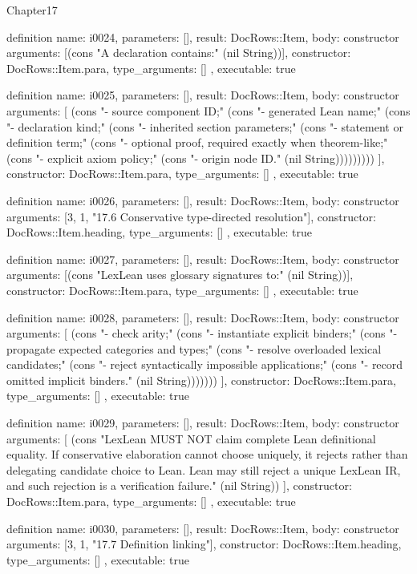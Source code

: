 \begin{lexlean}{Chapter17}
\begin{semanticmodule}
definition{
  name: i0024,
  parameters: [],
  result: DocRows::Item,
  body: constructor{
    arguments: [(cons "A declaration contains:" (nil String))],
    constructor: DocRows::Item.para,
    type_arguments: []
  },
  executable: true
}

definition{
  name: i0025,
  parameters: [],
  result: DocRows::Item,
  body: constructor{
    arguments: [
      (cons "- source component ID;" (cons "- generated Lean name;" (cons "- declaration kind;" (cons "- inherited section parameters;" (cons "- statement or definition term;" (cons "- optional proof, required exactly when theorem-like;" (cons "- explicit axiom policy;" (cons "- origin node ID." (nil String)))))))))
    ],
    constructor: DocRows::Item.para,
    type_arguments: []
  },
  executable: true
}

definition{
  name: i0026,
  parameters: [],
  result: DocRows::Item,
  body: constructor{
    arguments: [3, 1, "17.6 Conservative type-directed resolution"],
    constructor: DocRows::Item.heading,
    type_arguments: []
  },
  executable: true
}

definition{
  name: i0027,
  parameters: [],
  result: DocRows::Item,
  body: constructor{
    arguments: [(cons "LexLean uses glossary signatures to:" (nil String))],
    constructor: DocRows::Item.para,
    type_arguments: []
  },
  executable: true
}

definition{
  name: i0028,
  parameters: [],
  result: DocRows::Item,
  body: constructor{
    arguments: [
      (cons "- check arity;" (cons "- instantiate explicit binders;" (cons "- propagate expected categories and types;" (cons "- resolve overloaded lexical candidates;" (cons "- reject syntactically impossible applications;" (cons "- record omitted implicit binders." (nil String)))))))
    ],
    constructor: DocRows::Item.para,
    type_arguments: []
  },
  executable: true
}

definition{
  name: i0029,
  parameters: [],
  result: DocRows::Item,
  body: constructor{
    arguments: [
      (cons "LexLean MUST NOT claim complete Lean definitional equality. If conservative elaboration cannot choose uniquely, it rejects rather than delegating candidate choice to Lean. Lean may still reject a unique LexLean IR, and such rejection is a verification failure." (nil String))
    ],
    constructor: DocRows::Item.para,
    type_arguments: []
  },
  executable: true
}

definition{
  name: i0030,
  parameters: [],
  result: DocRows::Item,
  body: constructor{
    arguments: [3, 1, "17.7 Definition linking"],
    constructor: DocRows::Item.heading,
    type_arguments: []
  },
  executable: true
}


\end{semanticmodule}
\end{lexlean}
